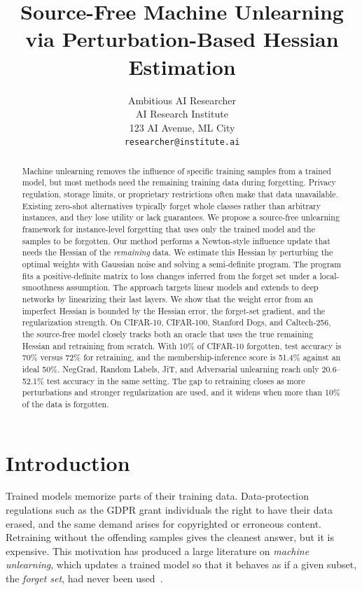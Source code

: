 \documentclass[10pt,twocolumn,letterpaper]{article}
\title{Source-Free Machine Unlearning via Perturbation-Based Hessian Estimation}
\author{Ambitious AI Researcher\\
AI Research Institute\\
123 AI Avenue, ML City\\
{\tt\small researcher@institute.ai}
}
\begin{document}
\maketitle

\begin{abstract}
Machine unlearning removes the influence of specific training samples from a trained model, but most methods need the remaining training data during forgetting. Privacy regulation, storage limits, or proprietary restrictions often make that data unavailable. Existing zero-shot alternatives typically forget whole classes rather than arbitrary instances, and they lose utility or lack guarantees. We propose a source-free unlearning framework for instance-level forgetting that uses only the trained model and the samples to be forgotten. Our method performs a Newton-style influence update that needs the Hessian of the \emph{remaining} data. We estimate this Hessian by perturbing the optimal weights with Gaussian noise and solving a semi-definite program. The program fits a positive-definite matrix to loss changes inferred from the forget set under a local-smoothness assumption. The approach targets linear models and extends to deep networks by linearizing their last layers. We show that the weight error from an imperfect Hessian is bounded by the Hessian error, the forget-set gradient, and the regularization strength. On CIFAR-10, CIFAR-100, Stanford Dogs, and Caltech-256, the source-free model closely tracks both an oracle that uses the true remaining Hessian and retraining from scratch. With 10\% of CIFAR-10 forgotten, test accuracy is 70\% versus 72\% for retraining, and the membership-inference score is 51.4\% against an ideal 50\%. NegGrad, Random Labels, JiT, and Adversarial unlearning reach only 20.6--52.1\% test accuracy in the same setting. The gap to retraining closes as more perturbations and stronger regularization are used, and it widens when more than 10\% of the data is forgotten.
\end{abstract}

\section{Introduction}
\label{sec:intro}
Trained models memorize parts of their training data. Data-protection regulations such as the GDPR grant individuals the right to have their data erased, and the same demand arises for copyrighted or erroneous content. Retraining without the offending samples gives the cleanest answer, but it is expensive. This motivation has produced a large literature on \emph{machine unlearning}, which updates a trained model so that it behaves as if a given subset, the \emph{forget set}, had never been used~\cite{cao2015towards,bourtoule2021machine,xu2023machine}.
\end{document}
